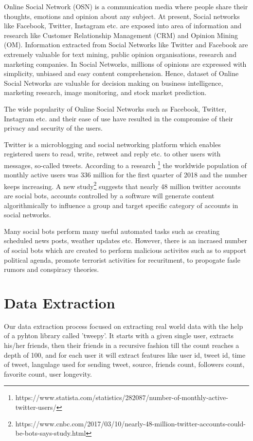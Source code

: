 \documentclass[conference]{IEEEtran}
\begin{document}
Online Social Network (OSN) is a communication media where people share their thoughts, emotions and opinion about any subject. At present, Social networks like Facebook, Twitter, Instagram etc. are exposed
into area of information and research like Customer Relationship Management (CRM) and Opinion Mining (OM). Information extracted from Social Networks like Twitter and Facebook are extremely valuable for text mining, public opinion organisations, research and marketing companies.
In Social Networks, millions of opinions are expressed with simplicity, unbiased and easy content comprehension. Hence, dataset of Online Social Networks are valuable for decision making on 
business intelligence, marketing research,  image monitoring, and stock market prediction.

The wide popularity of Online Social Networks such as Facebook, Twitter, Instagram etc. and their ease of use have resulted in the compromise of their privacy and security of the users. 

Twitter is a microblogging and social networking  platform which enables registered users to read, write, retweet and reply etc. to other users with messages, so-called tweets.
According to a research \footnote{https://www.statista.com/statistics/282087/number-of-monthly-active-twitter-users/} the worldwide population of monthly active users was 336 million for the first quarter of 2018 and the number keeps increasing. A new study\footnote{https://www.cnbc.com/2017/03/10/nearly-48-million-twitter-accounts-could-be-bots-says-study.html} suggests 
that nearly 48 million twitter accounts are social bots, accounts controlled by a software will generate content algorithmically to influence a group and target specific category of accounts in social networks.

Many social bots perform many useful automated tasks such as creating scheduled news posts, weather updates etc. However, there is an incrased number of social bots which are created to perform malicious activites such as to support political agenda, promote terrorist activities for recuritment, to propogate fasle rumors and conspiracy theories. 

\section{Data Extraction}

Our data extraction process focused on extracting real world data with the help of a pyhton library called 'tweepy'. It starts with a given single user, extracts his/her friends, then their friends in a recursive fashion till the count reaches a depth of 100, and for each user it will extract features like user id, tweet id, time of tweet, langulage used for sending tweet, source, friends count, followers count, favorite count, user longevity.
\end{document}
